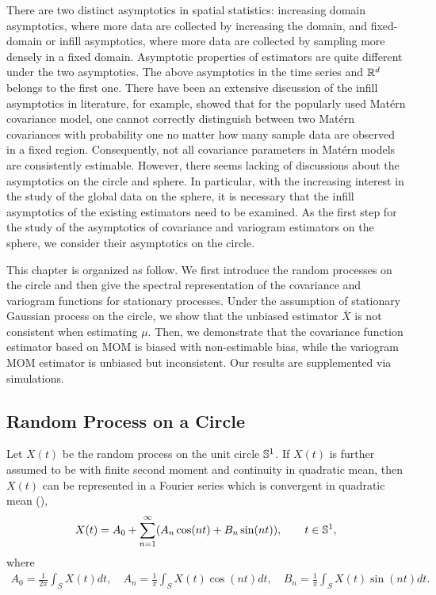 There are two distinct asymptotics in spatial statistics: increasing domain asymptotics, where more data are collected by increasing the domain, and fixed-domain or infill asymptotics, where more data are collected by sampling more densely in a fixed domain. Asymptotic properties of estimators are quite different under the two asymptotics. The above asymptotics in the time series and $\mathbb{R}^d$ belongs to the first one. There have been an extensive discussion of the infill asymptotics in literature, for example, \cite{Zhang:2004:IEA} showed that for the popularly used Mat\'{e}rn covariance model, one cannot correctly distinguish between two Mat\'{e}rn covariances with probability one no matter how many sample data are observed in a fixed region. Consequently, not all covariance parameters in Mat\'{e}rn models are consistently estimable. However, there seems lacking of discussions about the asymptotics on the circle and sphere. In particular, with the increasing interest in the study of the global data on the sphere, it is necessary that the infill asymptotics of the existing estimators need to be examined. As the first step for the study of the asymptotics of covariance and variogram estimators on the sphere, we consider their asymptotics on the circle. 

This chapter is organized as follow. We first introduce the random processes on the circle and then give the spectral representation of the covariance and variogram functions for stationary processes. Under the assumption of stationary Gaussian process on the circle, we show that the unbiased estimator $\bar{X}$ is not consistent when estimating $\mu$. Then, we demonstrate that the covariance function estimator based on MOM is biased with non-estimable bias, while the variogram MOM estimator is unbiased but inconsistent. Our results are supplemented via simulations.\\


\subsection{Random Process on a Circle}


Let $X(t)$ be the random process on the unit circle $\mathbb{S}^1$. If $X(t)$ is further assumed to be with finite second moment and continuity in quadratic mean, then $X(t)$ can be represented in a Fourier series which is convergent in quadratic mean (\cite{DUFOUR1976107}),
\[
X(t) = A_0 + \sum_{n=1}^\infty (A_n\cos(nt) + B_n \sin(nt)), \quad \quad t \in \mathbb{S}^1,
\]
where
\begin{eqnarray*}
A_0 = \frac{1}{2\pi}\int_S X(t)dt, \quad A_n = \frac{1}{\pi}\int_S X(t)\cos(nt)dt, \quad B_n = \frac{1}{\pi}\int_S X(t)\sin(nt)dt.
\end{eqnarray*}

